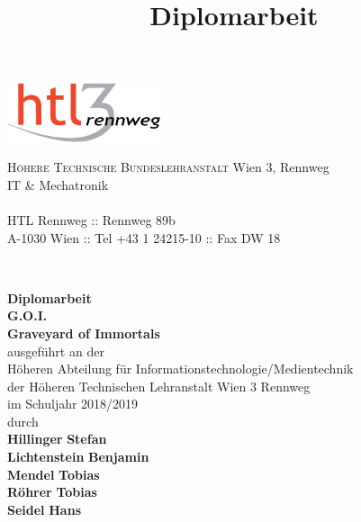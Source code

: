 \documentclass[
    headings=optiontotocandhead,%
    twoside,
    numbers=noenddot,%
    toc=flat, %
    12pt, %
    titlepage, %
    parskip=full, %
    listof=totoc, %
    listof=flat, %
    numbers=noenddot, %
    bibliography=totoc, %
    a4paper,DIV=14,
    BCOR=15mm,
]{scrbook}
\begin{document}
\newcommand{\kapitelautor}{}


\frontmatter %
\title{Diplomarbeit}
\begin{titlepage}
\begin{minipage}[b]{1\columnwidth}
\parbox[b]{50mm}{\includegraphics[width=45mm]{HTL3RLogoRGB}}
\hfill
\parbox[b]{130mm}{\footnotesize \textsc{Höhere Technische Bundeslehranstalt} Wien 3, Rennweg\\
IT \& Mechatronik\\
\\
HTL Rennweg :: Rennweg 89b\\
A-1030 Wien :: Tel +43 1 24215-10 :: Fax DW 18
}\\
\mbox{}
\end{minipage}

\vspace{1cm}


\begin{center}
\textbf{\LARGE{}Diplomarbeit}{\large{}}\\
{\large{}\vspace{15mm}
 }\textbf{\large{}G.O.I.}\\
\textbf{\large{}Graveyard of Immortals}\\
 \vspace{15mm}
 ausgeführt an der\\
 Höheren Abteilung für Informationstechnologie/Medientechnik\\
 der Höheren Technischen Lehranstalt Wien 3 Rennweg\\
 \vspace{1cm}
 im Schuljahr 2018/2019\\
 \vspace{1cm}
 durch\\
 \vspace{0.5cm}
\textbf{\large{}Hillinger} \textbf{\large{}Stefan}\\
\textbf{\large{}Lichtenstein} \textbf{\large{}Benjamin}\\
\textbf{\large{}Mendel} \textbf{\large{}Tobias}\\
\textbf{\large{}Röhrer} \textbf{\large{}Tobias}\\
\textbf{\large{}Seidel} \textbf{\large{}Hans}\\



\end{center}
\end{titlepage}
\end{document}
